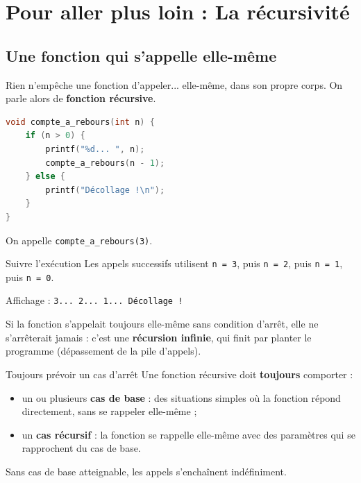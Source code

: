 \section{Pour aller plus loin : La récursivité}

\subsection{Une fonction qui s'appelle elle-même}

Rien n'empêche une fonction d'appeler... elle-même, dans son propre corps. On parle alors de \textbf{fonction récursive}.

\begin{lstlisting}[language=c,caption={Un compte à rebours},label=codeCompteARebours]
void compte_a_rebours(int n) {
    if (n > 0) {
        printf("%d... ", n);
        compte_a_rebours(n - 1);
    } else {
        printf("Décollage !\n");
    }
}
\end{lstlisting}

\begin{UPSTIactivite}
On appelle \texttt{compte\_a\_rebours(3)}.
\end{UPSTIactivite}

\begin{UPSTIprofOnlyEnv}
\begin{UPSTIcorrectionP}{Suivre l'exécution}
Les appels successifs utilisent \texttt{n = 3}, puis \texttt{n = 2}, puis \texttt{n = 1}, puis \texttt{n = 0}.

Affichage : \texttt{3... 2... 1... Décollage !}

Si la fonction s'appelait toujours elle-même sans condition d'arrêt, elle ne s'arrêterait jamais : c'est une \textbf{récursion infinie}, qui finit par planter le programme (dépassement de la pile d'appels).
\end{UPSTIcorrectionP}
\end{UPSTIprofOnlyEnv}

\begin{UPSTIwarning}{Toujours prévoir un cas d'arrêt}
  Une fonction récursive doit \textbf{toujours} comporter :
  \begin{itemize}
    \item un ou plusieurs \textbf{cas de base} : des situations simples où la fonction répond directement, sans se rappeler elle-même ;
    \item un \textbf{cas récursif} : la fonction se rappelle elle-même avec des paramètres qui se rapprochent du cas de base.
  \end{itemize}
  Sans cas de base atteignable, les appels s'enchaînent indéfiniment.
\end{UPSTIwarning}

